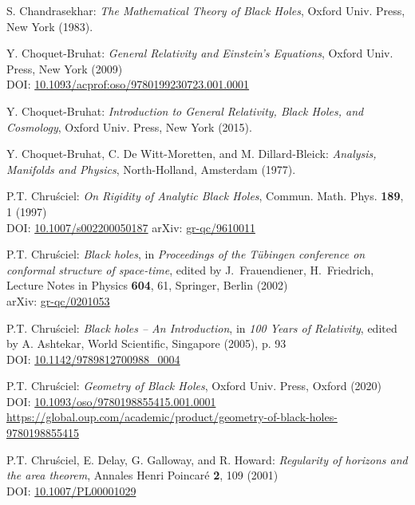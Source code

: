 \begin{thebibliography}{123}
S. Chandrasekhar: {\em The Mathematical Theory of Black Holes},
Oxford Univ. Press, New York (1983).

Y. Choquet-Bruhat: {\em General Relativity and Einstein's Equations},
Oxford Univ. Press, New York (2009)\\
DOI: \href{https://doi.org/10.1093/acprof:oso/9780199230723.001.0001}{10.1093/acprof:oso/9780199230723.001.0001}

Y. Choquet-Bruhat: {\em Introduction to General Relativity, Black Holes, and
Cosmology}, Oxford Univ. Press, New York (2015).

Y. Choquet-Bruhat, C. De Witt-Moretten, and M. Dillard-Bleick:
{\em Analysis, Manifolds and Physics},
North-Holland, Amsterdam (1977).

P.T. Chru\'sciel: {\em On Rigidity of Analytic Black Holes},
Commun. Math. Phys. {\bf 189}, 1 (1997) \\
DOI: \href{https://doi.org/10.1007/s002200050187}{10.1007/s002200050187}\hfill
arXiv: \href{https://arxiv.org/abs/gr-qc/9610011}{gr-qc/9610011}

P.T. Chru\'sciel: {\em Black holes},
in {\em Proceedings of the T\"ubingen conference on conformal structure of
space-time}, edited by J.~Frauendiener, H.~Friedrich,
Lecture Notes in Physics {\bf 604}, 61,
Springer, Berlin (2002)\\
arXiv: \href{https://arxiv.org/abs/gr-qc/0201053}{gr-qc/0201053}

P.T. Chru\'sciel: {\em Black holes -- An Introduction},
in {\em 100 Years of Relativity}, edited by A. Ashtekar,
World Scientific, Singapore (2005), p. 93\\
DOI: \href{https://doi.org/10.1142/9789812700988_0004}{10.1142/9789812700988\_0004}

P.T. Chru\'sciel: {\em Geometry of Black Holes},
Oxford Univ. Press, Oxford (2020)\\
DOI: \href{https://doi.org/10.1093/oso/9780198855415.001.0001}{10.1093/oso/9780198855415.001.0001}\\
{\footnotesize \url{https://global.oup.com/academic/product/geometry-of-black-holes-9780198855415}}

P.T. Chru\'sciel, E. Delay, G. Galloway, and R. Howard:
{\em Regularity of horizons and the area theorem},
Annales Henri Poincar\'e {\bf 2}, 109 (2001)\\
DOI: \href{https://doi.org/10.1007/PL00001029}{10.1007/PL00001029}


\end{thebibliography}
